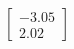 \documentclass[preview]{standalone}
\begin{document}
\begin{align*}
\begin{bmatrix} -3.05 \\ 2.02 \end{bmatrix}
\end{align*}
\end{document}
